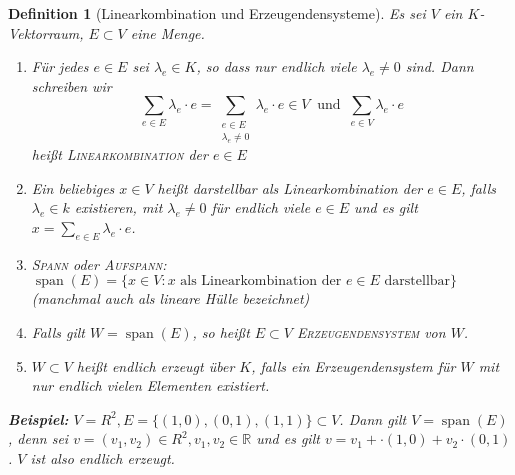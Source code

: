 \documentclass{report}
\newcommand{\lb}{\lambda}
\newcommand{\R}{\mathbb{R}}
\DeclareMathOperator{\Span}{span}
\theoremstyle{customrem}
\theoremstyle{customdef}
\newtheorem{definition}{Definition}[chapter]
\theoremstyle{customenv}
\newcommand{\defemph}[1]{\textsc{#1}}
\begin{document}
	\begin{definition}[Linearkombination und Erzeugendensysteme]
		Es sei \(V\) ein \(K\)-Vektorraum, \(E \subset V\) eine Menge.

		\begin{enumerate}
			\item Für jedes \(e \in E\) sei \(\lb_e \in K\), so dass nur endlich viele \(\lb_e \neq 0\) sind. Dann schreiben wir
			\[
			\sum_{e \in E}\lb_e \cdot e = \sum_{\substack{e\in E\\\lb_e \neq 0}} \lb_e \cdot e \in V\ \text{ und }\ \sum_{e \in V} \lb_e \cdot e
			\]
			heißt \defemph{Linearkombination} der \(e \in E\)
			\item Ein beliebiges \(x \in V\) heißt darstellbar als Linearkombination der \(e \in E\), falls \(\lb_e \in k\) existieren, mit \(\lb_e \neq 0\) für endlich viele \(e \in E\) und es gilt \(x = \sum_{e \in E}\lb_e \cdot e\).
			\item \defemph{Spann} oder \defemph{Aufspann}: \(\Span(E) = \{x \in V : x \text{ als Linearkombination der } e \in E \text{ darstellbar}\}\) (manchmal auch als lineare Hülle bezeichnet)
			\item Falls gilt \(W = \Span(E)\), so heißt \(E \subset V\) \defemph{Erzeugendensystem} von \(W\).
			\item \(W \subset V\) heißt endlich erzeugt über \(K\), falls ein Erzeugendensystem für \(W\) mit nur endlich vielen Elementen existiert.
		\end{enumerate}
		\textbf{Beispiel: }
		\(V = R^2, E = \{(1, 0), (0, 1), (1, 1)\} \subset V\). Dann gilt \(V = \Span(E)\), denn sei \(v = (v_1, v_2) \in R^2, v_1, v_2 \in \R\) und es gilt \(v = v_1 + \cdot (1, 0) + v_2 \cdot (0, 1)\). \(V\) ist also endlich erzeugt.

	\end{definition}
\end{document}
